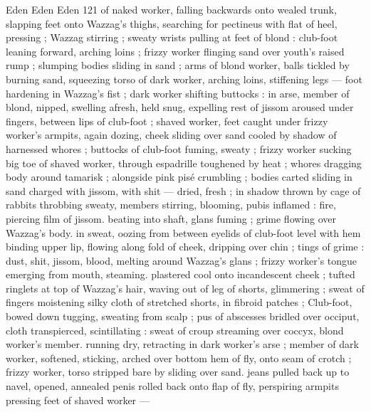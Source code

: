 Eden Eden Eden 121
of naked worker, falling backwards onto wealed trunk, slapping feet
onto Wazzag's thighs, searching for pectineus with flat of heel,
pressing ; Wazzag stirring ; sweaty wrists pulling at feet of blond :
club-foot leaning forward, arching loins ; frizzy worker flinging sand
over youth's raised rump ; slumping bodies sliding in sand ; arms of
blond worker, balls tickled by burning sand, squeezing torso of dark
worker, arching loins, stiffening legs — foot hardening in Wazzag's
fist ; dark worker shifting buttocks : in arse, member of blond,
nipped, swelling afresh, held snug, expelling rest of jissom aroused
under fingers, between lips of club-foot ; shaved worker, feet caught
under frizzy worker's armpits, again dozing, cheek sliding over sand
cooled by shadow of harnessed whores ; buttocks of club-foot
fuming, sweaty ; frizzy worker sucking big toe of shaved worker,
through espadrille toughened by heat ; whores dragging body
around tamarisk ; alongside pink pisé crumbling ; bodies carted
sliding in sand charged with jissom, with shit — dried, fresh ; in
shadow thrown by cage of rabbits throbbing sweaty, members
stirring, blooming, pubis inflamed : fire, piercing film of jissom.
beating into shaft, glans fuming ; grime flowing over Wazzag's body.
in sweat, oozing from between eyelids of club-foot level with hem
binding upper lip, flowing along fold of cheek, dripping over chin ;
tings of grime : dust, shit, jissom, blood, melting around Wazzag's
glans ; frizzy worker's tongue emerging from mouth, steaming.
plastered cool onto incandescent cheek ; tufted ringlets at top of
Wazzag's hair, waving out of leg of shorts, glimmering ; sweat of
fingers moistening silky cloth of stretched shorts, in fibroid patches
; Club-foot, bowed down tugging, sweating from scalp ; pus of
abscesses bridled over occiput, cloth transpierced, scintillating :
sweat of croup streaming over coccyx, blond worker's member.
running dry, retracting in dark worker's arse ; member of dark
worker, softened, sticking, arched over bottom hem of fly, onto seam
of crotch ; frizzy worker, torso stripped bare by sliding over sand.
jeans pulled back up to navel, opened, annealed penis rolled back
onto flap of fly, perspiring armpits pressing feet of shaved worker —

